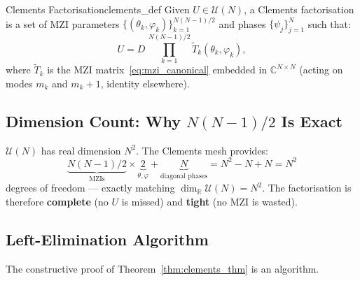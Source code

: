 \documentclass[12pt, a4paper]{article}
\newcommand{\CC}{\mathbb{C}}
\newcommand{\RR}{\mathbb{R}}
\newcommand{\calU}{\mathcal{U}}
\begin{document}
\begin{definition}{Clements Factorisation}{clements_def}
  Given $U\in\calU(N)$, a Clements factorisation is a set of MZI parameters
  $\{(\theta_k,\varphi_k)\}_{k=1}^{N(N-1)/2}$ and phases
  $\{\psi_j\}_{j=1}^N$ such that:
  \begin{equation}
    U = D\,\prod_{k=1}^{N(N-1)/2} \widetilde{T}_k(\theta_k,\varphi_k),
    \label{eq:clements_product}
  \end{equation}
  where $\widetilde{T}_k$ is the MZI matrix~\eqref{eq:mzi_canonical} embedded
  in $\CC^{N\times N}$ (acting on modes $m_k$ and $m_k+1$, identity elsewhere).
\end{definition}

\subsection{Dimension Count: Why $N(N-1)/2$ Is Exact}

$\calU(N)$ has real dimension $N^2$.
The Clements mesh provides:
\begin{equation}
  \underbrace{N(N-1)/2}_{\text{MZIs}} \times\underbrace{2}_{\theta,\varphi}
  + \underbrace{N}_{\text{diagonal phases}}
  = N^2 - N + N = N^2
  \label{eq:dof_count}
\end{equation}
degrees of freedom --- exactly matching $\dim_{\RR}\calU(N) = N^2$.
The factorisation is therefore \textbf{complete} (no $U$ is missed) and
\textbf{tight} (no MZI is wasted).

\subsection{Left-Elimination Algorithm}
\label{ssec:left_elim}

The constructive proof of Theorem~\ref{thm:clements_thm} is an algorithm.
\end{document}
